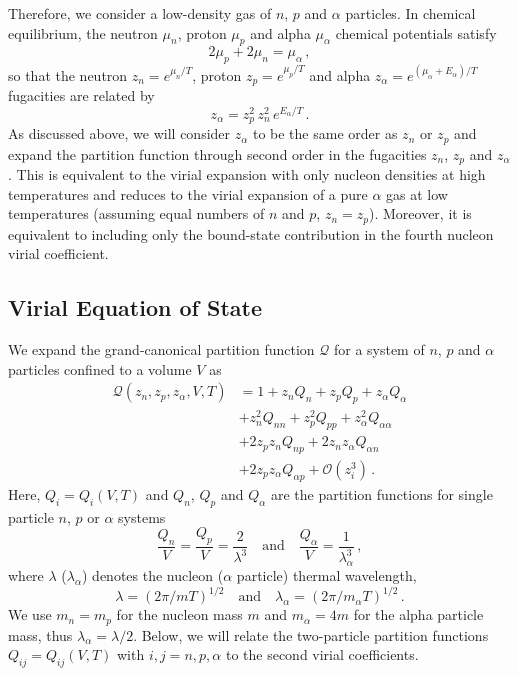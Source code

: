 \documentclass[aps,prc,twocolumn,showpacs,showkeys,amsmath,amssymb]{revtex4}
\begin{document}
Therefore, we consider a low-density gas of $n$, $p$ and $\alpha$ particles.  
In chemical equilibrium, the neutron $\mu_n$, proton $\mu_p$ and 
alpha $\mu_\alpha$ chemical potentials satisfy
\begin{equation}
2\mu_p+2\mu_n=\mu_\alpha\,,
\end{equation}
so that the neutron $z_n=e^{\mu_n/T}$, proton $z_p=e^{\mu_p/T}$ 
and alpha $z_\alpha=e^{(\mu_\alpha+E_\alpha)/T}$ fugacities are related by
\begin{equation}
z_\alpha=z_p^2 \, z_n^2 \, e^{E_\alpha/T} \,.
\label{zalpha}
\end{equation}
As discussed above, we will consider $z_\alpha$ to be the same order 
as $z_n$ or $z_p$ and expand the partition function through second 
order in the fugacities $z_n$, $z_p$ and $z_\alpha$.  This is equivalent
to the virial expansion with only nucleon densities at high temperatures 
and reduces to the virial expansion of a pure $\alpha$ gas at low 
temperatures (assuming equal numbers of $n$ and $p$, $z_n=z_p$).
Moreover, it is equivalent to including only the bound-state
contribution in the fourth nucleon virial coefficient.

\subsection{Virial Equation of State}

We expand the grand-canonical partition function $\mathcal{Q}$ for a system 
of $n$, $p$ and $\alpha$ particles confined to a volume $V$ as
\begin{align}
\mathcal{Q}(z_n,z_p,z_\alpha,V,T) &= 1 + z_n Q_n + z_p Q_p 
+ z_\alpha Q_\alpha
\nonumber \\[1mm]
&+ z_n^2 Q_{nn} + z_p^2 Q_{pp} + z_\alpha^2 Q_{\alpha\alpha}
\nonumber \\[1mm]
&+ 2z_pz_n Q_{np}+ 2z_nz_\alpha Q_{\alpha n} \nonumber \\[1mm]
&+ 2z_pz_\alpha Q_{\alpha p} + \mathcal{O}(z_i^3) \,.
\end{align}
Here, $Q_i=Q_i(V,T)$ and  $Q_n$, $Q_p$ and $Q_\alpha$ are the partition 
functions for single particle $n$, $p$ or $\alpha$ systems
\begin{equation}
\frac{Q_n}{V} = \frac{Q_p}{V} = \frac{2}{\lambda^3} \quad
\text{and} \quad \frac{Q_\alpha}{V} = \frac{1}{\lambda_\alpha^3} \,,
\end{equation}
where $\lambda$ ($\lambda_\alpha$) denotes the nucleon ($\alpha$ particle)
thermal wavelength,
\begin{equation}
\lambda = (2\pi/mT)^{1/2} \quad \text{and} \quad \lambda_\alpha = 
(2\pi/m_\alpha T)^{1/2} \,.
\end{equation}
We use $m_n=m_p$ for the nucleon mass $m$ and $m_\alpha=4m$ for the alpha 
particle mass, thus $\lambda_\alpha = \lambda/2$.  Below, we will relate 
the two-particle partition functions $Q_{ij}=Q_{ij}(V,T)$ with $i,j=n,p,
\alpha$ to the second virial coefficients.
\end{document}
